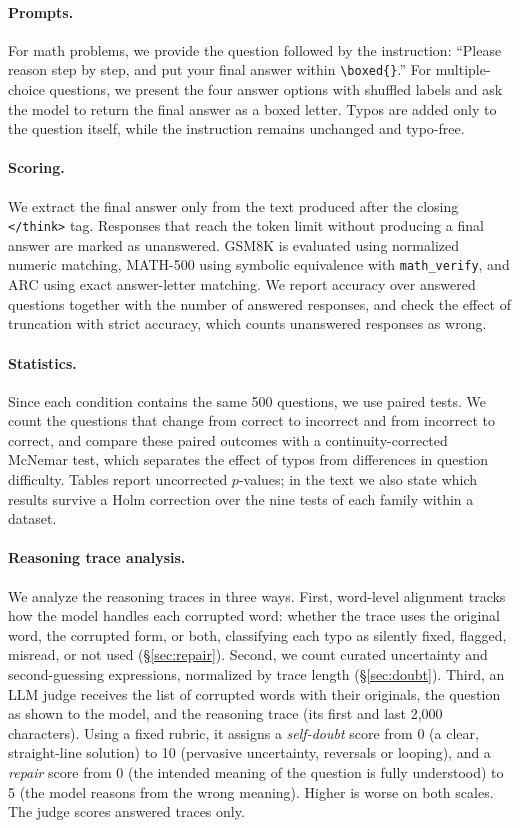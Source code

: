 \documentclass[11pt]{article}
\begin{document}
\paragraph{Prompts.}
For math problems, we provide the question followed by the instruction:
``Please reason step by step, and put your final answer within
\texttt{\textbackslash boxed\{\}}.'' For multiple-choice questions, we present
the four answer options with shuffled labels and ask the model to return the
final answer as a boxed letter. Typos are added only to the question itself,
while the instruction remains unchanged and typo-free.

\paragraph{Scoring.}
We extract the final answer only from the text produced after the closing
\texttt{</think>} tag. Responses that reach the token limit without producing a
final answer are marked as unanswered. GSM8K is evaluated using normalized
numeric matching, MATH-500 using symbolic equivalence with
\texttt{math\_verify}, and ARC using exact answer-letter matching. We report
accuracy over answered questions together with the number of answered
responses, and check the effect of truncation with strict accuracy, which
counts unanswered responses as wrong.

\paragraph{Statistics.}
Since each condition contains the same 500 questions, we use paired tests. We
count the questions that change from correct to incorrect and from incorrect to
correct, and compare these paired outcomes with a continuity-corrected McNemar
test, which separates the effect of typos from differences in question
difficulty. Tables report uncorrected $p$-values; in the text we also state
which results survive a Holm correction over the nine tests of each family
within a dataset.

\paragraph{Reasoning trace analysis.}
We analyze the reasoning traces in three ways. First, word-level alignment
tracks how the model handles each corrupted word: whether the trace uses the
original word, the corrupted form, or both, classifying each typo as silently
fixed, flagged, misread, or not used (\S\ref{sec:repair}). Second, we count
curated uncertainty and second-guessing expressions, normalized by trace length
(\S\ref{sec:doubt}). Third, an LLM judge receives the list of corrupted words
with their originals, the question as shown to the model, and the reasoning
trace (its first and last 2{,}000 characters). Using a fixed rubric, it assigns
a \emph{self-doubt} score from 0 (a clear, straight-line solution) to 10
(pervasive uncertainty, reversals or looping), and a \emph{repair} score from 0
(the intended meaning of the question is fully understood) to 5 (the model
reasons from the wrong meaning). Higher is worse on both scales. The judge
scores answered traces only.
\end{document}
